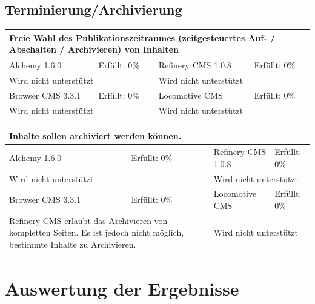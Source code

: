 \subsection{Terminierung/Archivierung}
\begin{tabular}[!ht]{|l|l|l|l|}
\hline
\multicolumn{4}{|p{15cm}|}{\textbf{Freie Wahl des Publikationszeitraumes (zeitgesteuertes Auf- / Abschalten / Archivieren) von Inhalten}} \\
\hline
  Alchemy 1.6.0 & \cellcolor{red}Erfüllt: 0\% & Refinery CMS 1.0.8 & \cellcolor{red}Erfüllt: 0\% \\
  \hline
  \multicolumn{2}{|p{7.5cm}|}{Wird nicht unterstützt} & \multicolumn{2}{p{7.5cm}|}{Wird nicht unterstützt} \\
  \hline
  Browser CMS 3.3.1 & \cellcolor{red}Erfüllt: 0\% & Locomotive CMS & \cellcolor{red}Erfüllt: 0\% \\
  \hline
  \multicolumn{2}{|p{7.5cm}|}{Wird nicht unterstützt} & \multicolumn{2}{p{7.5cm}|}{Wird nicht unterstützt} \\
\hline
\end{tabular}
\newline
\newline
\newline
\begin{tabular}[!ht]{|l|l|l|l|}
\hline
\multicolumn{4}{|p{15cm}|}{\textbf{Inhalte sollen archiviert werden können.}} \\
\hline
  Alchemy 1.6.0 & \cellcolor{red}Erfüllt: 0\% & Refinery CMS 1.0.8 & \cellcolor{red}Erfüllt: 0\% \\
  \hline
  \multicolumn{2}{|p{7.5cm}|}{Wird nicht unterstützt} & \multicolumn{2}{p{7.5cm}|}{Wird nicht unterstützt} \\
  \hline
  Browser CMS 3.3.1 & \cellcolor{red}Erfüllt: 0\% & Locomotive CMS & \cellcolor{red}Erfüllt: 0\% \\
  \hline
  \multicolumn{2}{|p{7.5cm}|}{Refinery CMS erlaubt das Archivieren von kompletten Seiten. Es ist jedoch nicht möglich, bestimmte Inhalte zu Archivieren.} & \multicolumn{2}{p{7.5cm}|}{Wird nicht unterstützt} \\
\hline
\end{tabular}





\newpage
\section{Auswertung der Ergebnisse}

